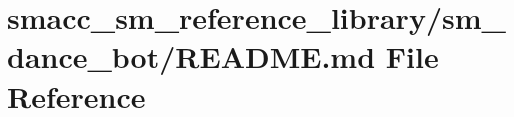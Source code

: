 \hypertarget{smacc__sm__reference__library_2sm__dance__bot_2README_8md}{}\section{smacc\+\_\+sm\+\_\+reference\+\_\+library/sm\+\_\+dance\+\_\+bot/\+R\+E\+A\+D\+ME.md File Reference}
\label{smacc__sm__reference__library_2sm__dance__bot_2README_8md}
